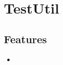 \section{TestUtil}
\label{module:TestUtil}
\AvailableInJavaOnly{\TODO}
\subsection{Features}
\begin{itemize}
	\item \TODO
\end{itemize}